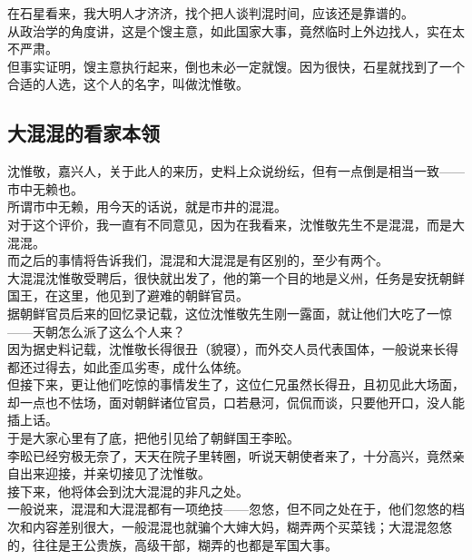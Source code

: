 \begin{multicols}{\theparacolNo}
在石星看来，我大明人才济济，找个把人谈判混时间，应该还是靠谱的。\\

从政治学的角度讲，这是个馊主意，如此国家大事，竟然临时上外边找人，实在太不严肃。\\

但事实证明，馊主意执行起来，倒也未必一定就馊。因为很快，石星就找到了一个合适的人选，这个人的名字，叫做沈惟敬。\\

\subsection{大混混的看家本领}
沈惟敬，嘉兴人，关于此人的来历，史料上众说纷纭，但有一点倒是相当一致——市中无赖也。\\

所谓市中无赖，用今天的话说，就是市井的混混。\\

对于这个评价，我一直有不同意见，因为在我看来，沈惟敬先生不是混混，而是大混混。\\

而之后的事情将告诉我们，混混和大混混是有区别的，至少有两个。\\

大混混沈惟敬受聘后，很快就出发了，他的第一个目的地是义州，任务是安抚朝鲜国王，在这里，他见到了避难的朝鲜官员。\\

据朝鲜官员后来的回忆录记载，这位沈惟敬先生刚一露面，就让他们大吃了一惊——天朝怎么派了这么个人来？\\

因为据史料记载，沈惟敬长得很丑（貌寝），而外交人员代表国体，一般说来长得都还过得去，如此歪瓜劣枣，成什么体统。\\

但接下来，更让他们吃惊的事情发生了，这位仁兄虽然长得丑，且初见此大场面，却一点也不怯场，面对朝鲜诸位官员，口若悬河，侃侃而谈，只要他开口，没人能插上话。\\

于是大家心里有了底，把他引见给了朝鲜国王李昖。\\

李昖已经穷极无奈了，天天在院子里转圈，听说天朝使者来了，十分高兴，竟然亲自出来迎接，并亲切接见了沈惟敬。\\

接下来，他将体会到沈大混混的非凡之处。\\

一般说来，混混和大混混都有一项绝技——忽悠，但不同之处在于，他们忽悠的档次和内容差别很大，一般混混也就骗个大婶大妈，糊弄两个买菜钱；大混混忽悠的，往往是王公贵族，高级干部，糊弄的也都是军国大事。\\


\end{multicols}
